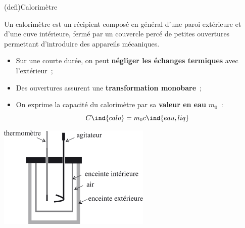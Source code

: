 \documentclass[../../main/main.tex]{subfiles}
\begin{document}
\begin{tcb*}(defi){Calorimètre}
	\noindent
	\begin{minipage}[c]{.68\linewidth}
		Un calorimètre est un récipient composé en général d’une paroi extérieure et
		d’une cuve intérieure, fermé par un couvercle percé de petites ouvertures
		permettant d’introduire des appareils mécaniques.
		\begin{itemize}
			\item Sur une courte durée, on peut \textbf{négliger les échanges
				      termiques} avec l'extérieur~;
			\item Des ouvertures assurent une \textbf{transformation monobare}~;
			\item On exprime la capacité du calorimètre par sa \textbf{valeur en
				      eau} $m_0$~:
			      \[
				      C\ind{calo} = m_0 c\ind{eau,liq}
			      \]
		\end{itemize}
	\end{minipage}
	\hfill
	\noindent
	\begin{minipage}[c]{.30\linewidth}
		\includegraphics[width=\linewidth]{calo_def}
	\end{minipage}
\end{tcb*}
\end{document}

